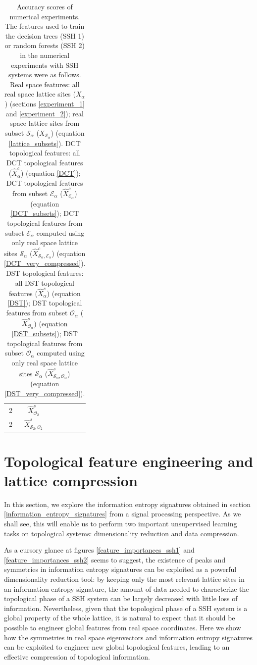 \documentclass[10pt]{revtex4-1}
\newcommand\accPrec{4}  %
\newcommand{\tableRow}[1]{\\[#1 cm]}
\newcommand\tableRowEnd{\tableRow{0.15}}
\newcommand\xsOTwo{$\hat{X}^s_{\mathcal{O}_2}$}
\newcommand\xsOTwoEigVal{\fpeval{round(0.9042001086956524,\accPrec)}}
\newcommand\xsOTwoEigTest{\fpeval{round(0.552662980209546,\accPrec)}}
\newcommand\xsOTwoHamVal{\fpeval{round(0.9917789855072465,\accPrec)}}
\newcommand\xsOTwoHamTest{\fpeval{round(0.7427124563445866,\accPrec)}}
\newcommand\xsSOTwo{$\hat{X}^s_{\mathcal{S}_2,\mathcal{O}_2}$}
\newcommand\xsSOTwoEigVal{\fpeval{round(0.8203919927536232,\accPrec)}}
\newcommand\xsSOTwoEigTest{\fpeval{round(0.41268987194412105,\accPrec)}}
\newcommand\xsSOTwoHamVal{\fpeval{round(0.9941884057971013,\accPrec)}}
\newcommand\xsSOTwoHamTest{\fpeval{round(0.5903026775320139,\accPrec)}}
\newcommand\xalpha{$X_\alpha$}
\newcommand\xSalpha{$X_{\mathcal{S}_\alpha}$}
\newcommand\xcalpha{$\hat{X}^c_\alpha$}
\newcommand\xcEalpha{$\hat{X}^c_{\mathcal{E}_\alpha}$}
\newcommand\xcSEalpha{$\hat{X}^c_{\mathcal{S}_\alpha,\mathcal{E}_\alpha}$}
\newcommand\xsalpha{$\hat{X}^s_\alpha$}
\newcommand\xsOalpha{$\hat{X}^s_{\mathcal{O}_\alpha}$}
\newcommand\xsSOalpha{$\hat{X}^s_{\mathcal{S}_\alpha,\mathcal{O}_\alpha}$}
\begin{document}
\begin{table}
\begin{tabular}{||c@{\hskip 0.3in} c@{\hskip 0.3in} c@{\hskip 0.3in} c@{\hskip 0.3in} c@{\hskip 0.3in} c||}
2                     &\xsOTwo           &\xsOTwoEigVal      &\xsOTwoEigTest     &\xsOTwoHamVal        &\xsOTwoHamTest     \tableRowEnd
2                     &\xsSOTwo          &\xsSOTwoEigVal     &\xsSOTwoEigTest    &\xsSOTwoHamVal       &\xsSOTwoHamTest    \tableRowEnd
\bottomrule
\end{tabular}
\caption{\label{accuracy_scores}Accuracy scores of numerical experiments. The features used to train the decision trees (SSH 1) or random forests (SSH 2) in the numerical experiments with SSH systems were as follows. Real space features: all real space lattice sites (\xalpha) (sections \ref{experiment_1} and \ref{experiment_2}); real space lattice sites from subset $\mathcal{S}_{\alpha}$ (\xSalpha) (equation \eqref{lattice_subsets}). DCT topological features: all DCT topological features (\xcalpha) (equation \eqref{DCT}); DCT topological features from subset $\mathcal{E}_\alpha$ (\xcEalpha) (equation \eqref{DCT_subsets}); DCT topological features from subset $\mathcal{E}_\alpha$ computed using only real space lattice sites $\mathcal{S}_{\alpha}$ (\xcSEalpha) (equation \eqref{DCT_very_compressed}). DST topological features: all DST topological features (\xsalpha) (equation \eqref{DST}); DST topological features from subset $\mathcal{O}_\alpha$ (\xsOalpha) (equation \eqref{DST_subsets}); DST topological features from subset $\mathcal{O}_\alpha$ computed using only real space lattice sites $\mathcal{S}_{\alpha}$ (\xsSOalpha) (equation \eqref{DST_very_compressed}). }
\end{table}




\section{Topological feature engineering and lattice compression}
\label{topological_feature_engineering}

In this section, we explore the information entropy signatures obtained in section \ref{information_entropy_signatures} from a signal processing perspective. As we shall see, this will enable us to perform two important unsupervised learning tasks on topological systems: dimensionality reduction and data compression. 

As a cursory glance at figures \ref{feature_importances_ssh1} and \ref{feature_importances_ssh2} seems to suggest, the existence of peaks and symmetries in information entropy signatures can be exploited as a powerful dimensionality reduction tool: by keeping only the most relevant lattice sites in an information entropy signature, the amount of data needed to characterize the topological phase of a SSH system can be largely decreased with little loss of information. Nevertheless, given that the topological phase of a SSH system is a global property of the whole lattice, it is natural to expect that it should be possible to engineer global features from real space coordinates. Here we show how the symmetries in real space eigenvectors and information entropy signatures can be exploited to engineer new global topological features, leading to an effective compression of topological information.
\end{document}
